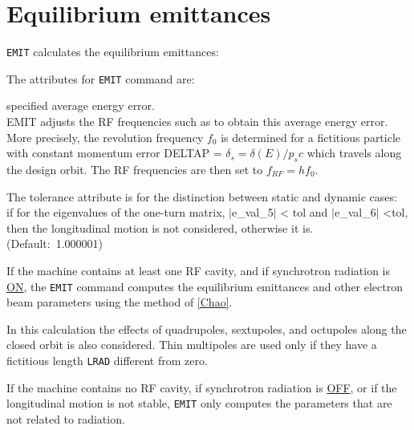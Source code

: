 
\chapter{Equilibrium emittances} 
\label{chap:emit}

\texttt{EMIT} calculates the equilibrium emittances: 

\vspace{5mm}

The attributes for \texttt{EMIT} command are: 

\begin{madlist}
   specified average energy error. \\
  EMIT adjusts the RF frequencies such as to obtain this
  average energy error. More precisely, the revolution frequency $f_0$
  is determined for a fictitious particle with constant momentum error  
  DELTAP = $\delta_s = \delta(E) / p_s c$ which travels along the design
  orbit. The RF frequencies are then set to   
  $f_{RF} = h f_0$. 

   The tolerance attribute is for the distinction between
  static and dynamic cases: \\
  if for the eigenvalues of the one-turn matrix, $|$e\_val\_5$|$ \textless
  tol and $|$e\_val\_6$|$ \textless tol, then the longitudinal motion is
  not considered, otherwise it is. \\
  (Default:~1.000001)  
\end{madlist}


If the machine contains at least one RF cavity, and if synchrotron
radiation is \href{../Introduction/beam.html#radiate}{ON}, the
\texttt{EMIT} command computes the equilibrium emittances and other
electron beam parameters using the method of 
\href{../Introduction/bibliography.html#chao}{[Chao]}. 

In this calculation the effects of quadrupoles, sextupoles, and
octupoles along the closed orbit is also considered. Thin multipoles are
used only if they have a fictitious length \texttt{LRAD} different from zero.  

If the machine contains no RF cavity, if synchrotron radiation is
\href{../Introduction/beam.html#radiate}{OFF}, or if the longitudinal
motion is not stable, \texttt{EMIT} only computes the parameters that
are not related to radiation.  

